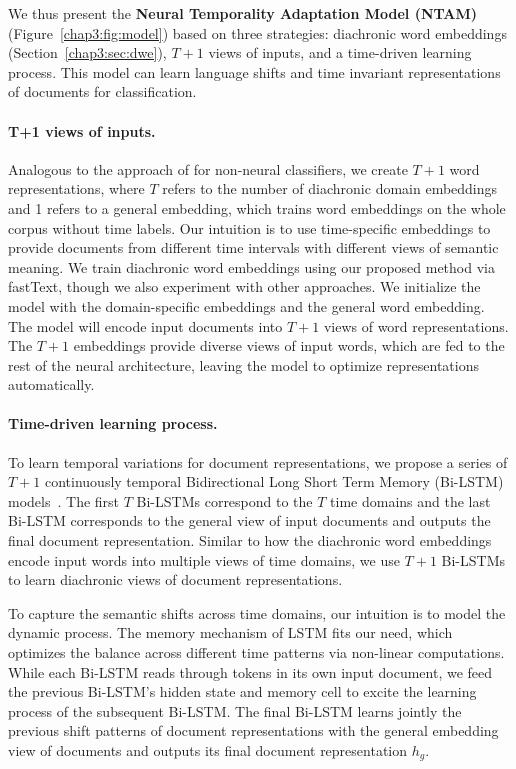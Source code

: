 We thus present the {\bf Neural Temporality Adaptation Model (NTAM)} (Figure~\ref{chap3:fig:model}) based on three strategies: diachronic word embeddings (Section~\ref{chap3:sec:dwe}), $T+1$ views of inputs, and a time-driven learning process.
This model can learn language shifts and time invariant representations of documents for classification.

\paragraph{T+1 views of inputs.}
Analogous to the approach of \cite{daume2007frustratingly} for non-neural classifiers, 
we create $T+1$ word representations, where $T$ refers to the number of diachronic domain embeddings and 1 refers to a general embedding, which trains word embeddings on the whole corpus without time labels. Our intuition is to use time-specific embeddings to provide documents from different time intervals with different views of semantic meaning. 
We train diachronic word embeddings using our proposed method via fastText, though we also experiment with other approaches. 
We initialize the model with the domain-specific embeddings and the general word embedding. The model will encode input documents into $T+1$ views of word representations. 
The $T+1$ embeddings provide diverse views of input words, which are fed to the rest of the neural architecture, leaving the model to optimize representations automatically.

\paragraph{Time-driven learning process.}
To learn temporal variations for document representations, we propose a series of $T+1$ continuously temporal Bidirectional Long Short Term Memory (Bi-LSTM) models~\cite{hochreiter1997long}. The first $T$ Bi-LSTMs correspond to the $T$ time domains and the last Bi-LSTM corresponds to the general view of input documents and outputs the final document representation. Similar to how the diachronic word embeddings encode input words into multiple views of time domains, we use $T+1$ Bi-LSTMs to learn diachronic views of document representations. 

To capture the semantic shifts across time domains, our intuition is to model the dynamic process. The memory mechanism of LSTM fits our need, which optimizes the balance across different time patterns via non-linear computations. While each Bi-LSTM reads through tokens in its own input document, we feed the previous Bi-LSTM's hidden state and memory cell to excite the learning process of the subsequent Bi-LSTM. The final Bi-LSTM learns jointly the previous shift patterns of document representations with the general embedding view of documents and outputs its final document representation $h_g$. 

